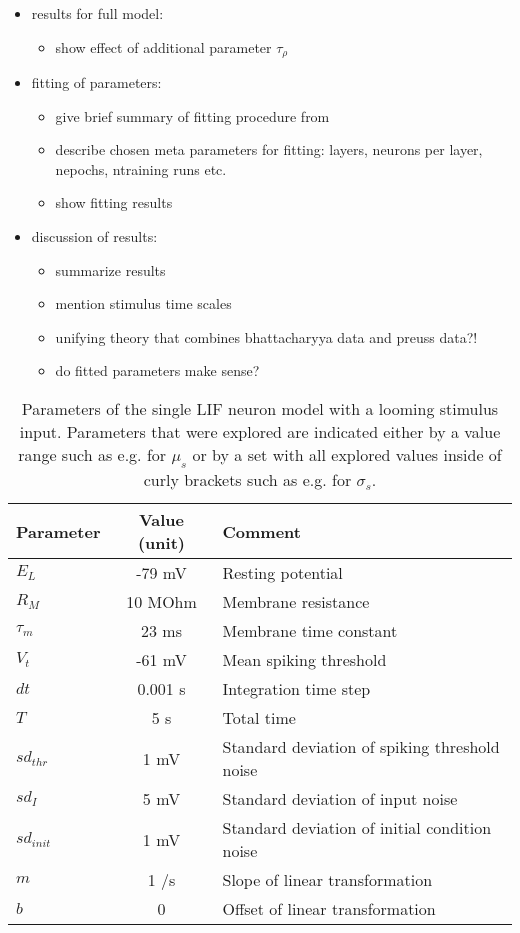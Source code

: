 \documentclass[a4paper,10pt,hidelinks]{scrreprt}
\begin{document}
\begin{itemize}
		\item results for full model:
		\begin{itemize}
			\item show effect of additional parameter $\tau_{\rho}$
		\end{itemize}
		\item fitting of parameters:
		\begin{itemize}
			\item give brief summary of fitting procedure from \cite{Lueckmann2018}
			\item describe chosen meta parameters for fitting: layers, neurons per layer, nepochs, 
			ntraining runs etc.
			\item show fitting results
		\end{itemize}
		\item discussion of results:
		\begin{itemize}
			\item summarize results
			\item mention stimulus time scales
			\item unifying theory that combines bhattacharyya data and preuss data?!
			\item do fitted parameters make sense?
		\end{itemize}
	\end{itemize}
	\begin{table} [!th]
		\begin{center}
			\begin{tabular}{l|c|p{7cm}}
				\textbf{Parameter} & \textbf{Value (unit)} & \textbf{Comment} \\
				\hline
				$E_L$ & -79 mV & Resting potential\\
				$R_M$ & 10 MOhm & Membrane resistance\\
				$\tau_{m}$ & 23 ms & Membrane time constant\\
				$V_t$ & -61 mV & Mean spiking threshold\\
				$dt$ & 0.001 s & Integration time step\\
				$T$ & 5 s & Total time\\
				$sd_{thr}$ & 1 mV & Standard deviation of spiking threshold noise\\
				$sd_{I}$ & 5 mV & Standard deviation of input noise\\
				$sd_{init}$ & 1 mV & Standard deviation of initial condition noise\\
				$m$ & 1 \textdegree/s  & Slope of linear transformation\\
				$b$ & 0 \textdegree & Offset of linear transformation\\
			\end{tabular}
		\end{center}
		\caption{Parameters of the single LIF neuron model with a looming stimulus input. Parameters that were explored are indicated either by a value range such as e.g. for $\mu_s$ or by a set with all explored values inside of curly brackets such as e.g. for $\sigma_s$.}
		\label{tab:neuroparams}
	\end{table}
\end{document}

